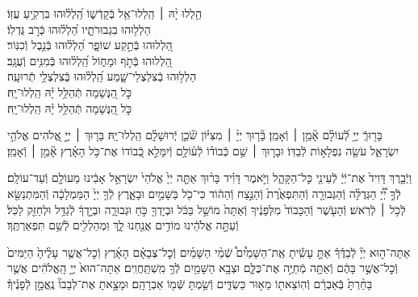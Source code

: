 \documentclass[twoside, openany, parskip=half, 11pt]{book}
\begin{document}
\begin{narrow}
הַ֥לְלוּ יָ֨הּ ׀ \hfill \break
הַֽלְלוּ־אֵ֥ל בְּֿקָדְֿשׁ֑וֹ \hfill הַֽ֝לְל֗וּהוּ בִּרְקִ֥יעַ עֻזּֽוֹ׃ \\
הַלְל֥וּהוּ בִגְבוּרֹתָ֑יו \hfill הַ֝לְל֗וּהוּ כְּֿרֹ֣ב גֻּדְלֽוֹ׃ \\
הַ֭לְלוּהוּ בְּֿתֵ֣קַע שׁוֹפָ֑ר \hfill הַ֝לְל֗וּהוּ בְּֿנֵ֣בֶל וְֿכִנּֽוֹר׃ \\
הַ֭לְלוּהוּ בְּֿתֹ֣ף וּמָח֑וֹל \hfill הַֽ֝לְל֗וּהוּ בְּֿמִנִּ֥ים וְֿעֻגָֽב׃ \\
הַלְל֥וּהוּ בְֿצִלְצְלֵי־שָׁ֑מַע \hfill הַֽ֝לְל֗וּהוּ בְּֽֿצִלְצְלֵ֥י תְֿרוּעָֽה׃ \\
כֹּ֣ל הַ֭נְּשָׁמָה תְּֿהַלֵּ֥ל יָ֗הּ \hfill הַֽלְלוּ־יָֽהּ׃ \\
\scriptsize{כֹּ֣ל הַ֭נְּשָׁמָה תְּֿהַלֵּ֥ל יָ֗הּ \hfill הַֽלְלוּ־יָֽהּ׃ \\}
\normalsize{}

\end{narrow}



בָּר֖וּךְֿ
יְיָ֥ לְֿ֝עוֹלָ֗ם אָ֘מֵ֥ן ׀ וְֿאָמֵֽן׃
בָּ֘ר֤וּךְ יְיָ֨ ׀ מִצִּיּ֗וֹן שֹׁ֘כֵ֤ן יְֽֿרוּשָׁלָ֗‍ִם הַֽלְלוּ־יָֽהּ׃
בָּר֤וּךְ ׀ יְיָ֣ אֱ֭לֹהִים אֱלֹהֵ֣י יִשְׂרָאֵ֑ל עֹשֵׂ֖ה נִפְלָא֣וֹת לְֿבַדּֽוֹ׃
וּבָר֤וּךְ ׀ שֵׁ֥ם כְּֿבוֹד֗וֹ לְֿע֫וֹלָ֥ם וְֿיִמָּלֵ֣א כְֿ֭בוֹדוֹ אֶת־כֹּ֥ל הָאָ֗רֶץ אָ֘מֵ֥ן ׀ וְֿאָמֵֽן׃





וַיְֿבָ֤רֶךְ
דָּוִיד֙ אֶת־יְֿיָ֔ לְֿעֵינֵ֖י כׇּל־הַקָּהָ֑ל וַיֹּ֣אמֶר דָּוִ֗יד בָּר֨וּךְ אַתָּ֤ה יְיָ֙ אֱלֹהֵי֙ יִשְׂרָאֵ֣ל אָבִ֔ינוּ מֵעוֹלָ֖ם וְֿעַד־עוֹלָֽם׃
לְֿךָ֣ יְ֠יָ֠ הַגְּדֻלָּ֨ה וְֿהַגְּבוּרָ֤ה וְֿהַתִּפְאֶ֙רֶת֙ וְֿהַנֵּ֣צַח וְֿהַה֔וֹד כִּי־כֹ֖ל בַּשָּׁמַ֣יִם וּבָאָ֑רֶץ לְֿךָ֤ יְיָ֙ הַמַּמְלָכָ֔ה וְֿהַמִּתְנַשֵּׂ֖א לְֿכֹ֥ל ׀ לְֿרֹֽאשׁ׃
וְֿהָעֹ֤שֶׁר וְֿהַכָּבוֹד֙ מִלְּפָנֶ֔יךָ וְֿאַתָּה֙ מוֹשֵׁ֣ל בַּכֹּ֔ל וּבְיָדְךָ֖ כֹּ֣חַ וּגְבוּרָ֑ה וּבְיָ֣דְךָ֔ לְֿגַדֵּ֥ל וּלְחַזֵּ֖ק לַכֹּֽל׃
וְֿעַתָּ֣ה אֱלֹהֵ֔ינוּ מוֹדִ֥ים אֲנַ֖חְנוּ לָ֑ךְ וּֽמְהַלְלִ֖ים לְֿשֵׁ֥ם תִּפְאַרְתֶּֽךָ׃



אַתָּה־ה֣וּא
יְיָ֘ לְֿבַדֶּ֒ךָ֒ אַתָּ֣ עָשִֽׂ֡יתָ אֶֽת־הַשָּׁמַ֩יִם֩ שְֿׁמֵ֨י הַשָּׁמַ֜יִם וְֿכׇל־צְבָאָ֗ם הָאָ֜רֶץ וְֿכׇל־אֲשֶׁ֤ר עָלֶ֨יהָ֙ הַיַּמִּים֙ וְֿכׇל־אֲשֶׁ֣ר בָּהֶ֔ם וְֿאַתָּ֖ה מְֿחַיֶּ֣ה אֶת־כֻּלָּ֑ם וּצְבָ֥א הַשָּׁמַ֖יִם לְֿךָ֥ מִֽשְׁתַּֽחֲוִֽים׃
אַתָּה־הוּא֙ יְיָ֣ הָֽאֱלֹהִ֔ים אֲשֶׁ֤ר בָּחַ֨רְתָּ֙ בְּֿאַבְרָ֔ם וְֿהֽוֹצֵאת֖וֹ מֵא֣וּר כַּשְׂדִּ֑ים וְֿשַׂ֥מְתָּ שְּֿׁמ֖וֹ אַבְרָהָֽם׃ וּמָצָ֣אתָ אֶת־לְבָבוֹ֘ נֶֽאֱמָ֣ן לְֿפָנֶ֒יךָ֒׃
\end{document}
